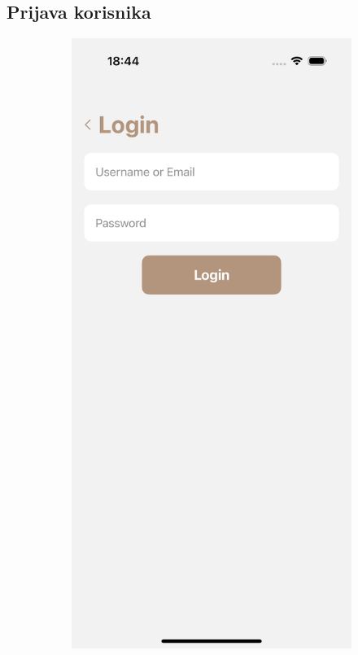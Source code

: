 \subsection{Prijava korisnika}

\begin{figure}[H]
  \centering
  \begin{subfigure}{.35\textwidth}
    \centering
    \includegraphics[width=0.9\linewidth]{images/implementacija/login.png}

\end{subfigure}
\end{figure}
